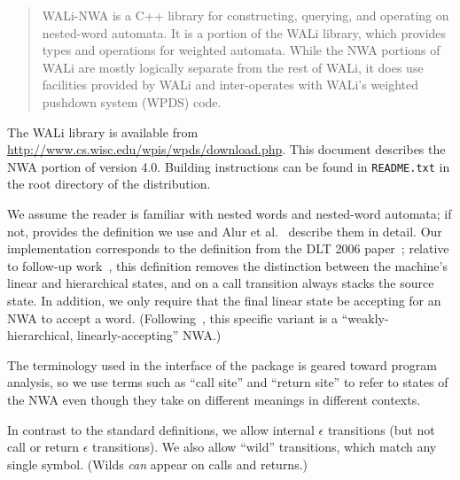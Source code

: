 \begin{abstract}

WALi-NWA is a C++ library for constructing, querying, and operating on
nested-word automata.  It is a portion of the WALi library, which provides
types and operations for weighted automata.
While the NWA portions of WALi
are mostly logically separate from the rest of WALi, it does use
facilities provided by WALi and inter-operates with WALi's weighted pushdown
system (WPDS) code.

\end{abstract}

The WALi library is available from
\url{http://www.cs.wisc.edu/wpis/wpds/download.php}. This document describes
the NWA portion of version 4.0. Building instructions can be found in
\texttt{README.txt} in the root directory of the distribution.

We assume the reader is familiar with nested words and
nested-word automata; if not,  provides the definition
we use and
Alur et al.~\cite{DLT:AM2006,JACM:AM2009} describe them in detail. Our
implementation corresponds to the definition from the DLT 2006
paper~\cite{DLT:AM2006}; relative to follow-up work~\cite{JACM:AM2009}, this definition removes
the distinction between the machine's linear and hierarchical states, and on
a call transition always stacks the source state. In addition, we only require that the
final linear state be accepting for an NWA to accept a
word. (Following~\cite{JACM:AM2009}, this specific variant is a
``weakly-hierarchical, linearly-accepting'' NWA.)

The terminology used in the interface of the package is geared
toward program analysis, so we use terms such as ``call site'' and ``return
site'' to refer to states of the NWA even though they take on different
meanings in different contexts.

In contrast to the standard definitions, we allow internal $\epsilon$
transitions (but not call or return $\epsilon$ transitions). We also allow ``wild''
transitions, which match any single symbol. (Wilds \emph{can} appear on calls
and returns.)




\vfill

